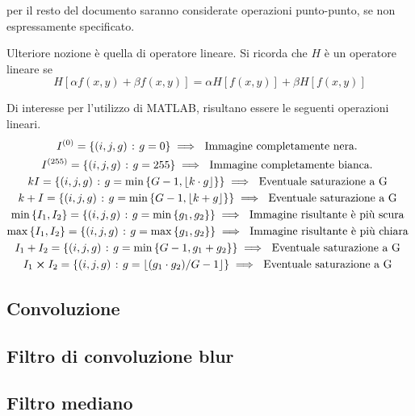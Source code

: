 \documentclass{subfiles}
\begin{document}
\begin{Note*}
    per il resto del documento saranno considerate operazioni punto-punto, se non espressamente specificato.
\end{Note*}

\noindent Ulteriore nozione è quella di operatore lineare. Si ricorda che \(H\) è un operatore lineare se
\begin{equation}
    H[\alpha f(x,y) + \beta f(x,y)] = \alpha H[f(x,y)] + \beta H[f(x, y)]
\end{equation}

Di interesse per l'utilizzo di MATLAB, risultano essere le seguenti operazioni lineari.
\[\begin{gathered}
        I^{(0)} = \set{(i,j,g)}{g = 0} \implies \text{Immagine completamente nera.} \\
        I^{(255)} = \set{(i,j,g)}{g = 255} \implies \text{Immagine completamente bianca.} \\
        kI = \set{(i,j,g)}{g = \min{G - 1, \floor{k \cdot g}}} \implies \text{Eventuale saturazione a G} \\
        k + I = \set{(i,j,g)}{g = \min{G - 1, \floor{k + g}}} \implies \text{Eventuale saturazione a G} \\
        \min{I_{1}, I_{2}} = \set{(i,j,g)}{g = \min{g_{1}, g_{2}}} \implies \text{Immagine risultante è più scura} \\
        \max{I_{1}, I_{2}} = \set{(i,j,g)}{g = \max{g_{1}, g_{2}}} \implies \text{Immagine risultante è più chiara} \\
        I_{1} + I_{2} = \set{(i,j,g)}{g = \min{G - 1, g_{1} + g_{2}}} \implies \text{Eventuale saturazione a G} \\
        I_{1} \cp I_{2} = \set{(i,j,g)}{g = \floor{(g_{1} \cdot g_{2})/G - 1}} \implies \text{Eventuale saturazione a G} \\
    \end{gathered}\]
\clearpage

\subsection{Convoluzione}


\subsection{Filtro di convoluzione blur}

\clearpage

\subsection{Filtro mediano}

\clearpage

% 
\end{document}
